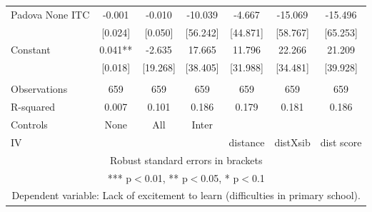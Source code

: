 \begin{tabular}{lcccccc}
Padova None ITC & -0.001 & -0.010 & -10.039 & -4.667 & -15.069 & -15.496 \\
 & [0.024] & [0.050] & [56.242] & [44.871] & [58.767] & [65.253] \\
Constant & 0.041** & -2.635 & 17.665 & 11.796 & 22.266 & 21.209 \\
 & [0.018] & [19.268] & [38.405] & [31.988] & [34.481] & [39.928] \\
 &  &  &  &  &  &  \\
Observations & 659 & 659 & 659 & 659 & 659 & 659 \\
R-squared & 0.007 & 0.101 & 0.186 & 0.179 & 0.181 & 0.186 \\
Controls & None & All & Inter &  &  &  \\
 IV &  &  &  & distance & distXsib & dist score \\ \hline
\multicolumn{7}{c}{ Robust standard errors in brackets} \\
\multicolumn{7}{c}{ *** p$<$0.01, ** p$<$0.05, * p$<$0.1} \\
\multicolumn{7}{c}{ Dependent variable: Lack of excitement to learn (difficulties in primary school).} \\
\end{tabular}
